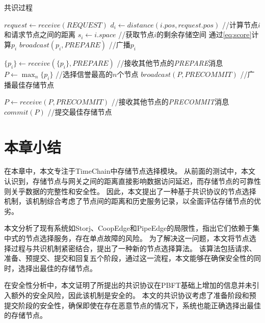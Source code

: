 \begin{algorithm}
	\caption{共识过程}
	\label{algo:consensus}
	\begin{algorithmic}[1]
        \renewcommand{\algorithmicrequire}{ \textbf{准备阶段}}
        \REQUIRE
            \STATE $request \gets \textit{receive}(REQUEST)$
                \STATE $d_i \gets \textit{distance}(i.pos, request.pos)$ //计算节点$i$和请求节点之间的距离
                \STATE $s_i \gets i.space$ //获取节点$i$的剩余存储空间
                \STATE 通过\autoref{eq:score}计算$p_i$
                \STATE $\textit{broadcast}(p_i, \textit{PREPARE})$  //广播$p_i$
            \ENDIF

        \renewcommand{\algorithmicrequire}{ \textbf{预提交阶段}}
        \REQUIRE
            \STATE $\{p_i\} \gets \textit{receive}(\{p_i\}, \textit{PREPARE})$  //接收其他节点的\textit{PREPARE}消息
                \STATE $P \gets \max_n \{p_i\}$ //选择信誉最高的$n$个节点
                \STATE $\textit{broadcast}(P, \textit{PRECOMMIT})$  //广播最佳存储节点
            \ENDIF

        \renewcommand{\algorithmicrequire}{ \textbf{提交阶段}}
        \REQUIRE
            \STATE $P \gets \textit{receive}(P, \textit{PRECOMMIT})$    //接收其他节点的\textit{PRECOMMIT}消息
                \STATE $\textit{commit}(P)$ //提交最佳存储节点
            \ENDIF
	\end{algorithmic}
\end{algorithm}

\section{本章小结}
在本章中，本文专注于TimeChain中存储节点选择模块。
从前面的测试中，本文认识到，存储节点与网关之间的距离直接影响数据访问延迟，而存储节点的可靠性则关乎数据的完整性和安全性。
因此，本文提出了一种基于共识协议的节点选择机制，该机制综合考虑了节点间的距离和历史服务记录，以全面评估存储节点的优劣。

本文分析了现有系统如Storj、CoopEdge和PipeEdge的局限性，指出它们依赖于集中式的节点选择服务，存在单点故障的风险。
为了解决这一问题，本文将节点选择过程与共识机制紧密结合，提出了一种新的节点选择算法。
该算法包括请求、准备、预提交、提交和回复五个阶段，通过这一流程，本文能够在确保安全性的同时，选择出最佳的存储节点。

在安全性分析中，本文证明了所提出的共识协议在PBFT基础上增加的信息并未引入额外的安全风险，因此该机制是安全的。
本文的共识协议考虑了准备阶段和预提交阶段的安全性，确保即使在存在恶意节点的情况下，系统也能正确选择出最佳的存储节点。


